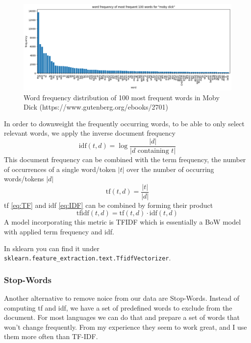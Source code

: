 \begin{figure}[h]
  \centering
  \includegraphics[width=.95\textwidth]{images/word-distribution.png}
  \caption{Word frequency distribution of 100 most frequent words in Moby Dick (https://www.gutenberg.org/ebooks/2701)}
  \label{fig:word-freq-dist}
\end{figure}
In order to downweight the frequently occurring words, to be able to only select relevant words, we apply the inverse
document frequency
\begin{equation}
  \text{idf}(t, d) = \log \frac{|d|}{|d \text{ containing } t|}
  \label{eq:IDF}
\end{equation}
This document frequency can be combined with the term frequency, the number of occurrences of a single word/token $|t|$ over the number of occurring words/tokens $|d|$
\begin{equation}
  \text{tf}(t, d) = \frac{|t|}{|d|}
  \label{eq:TF}
\end{equation}
tf \eqref{eq:TF} and idf \eqref{eq:IDF} can be combined by forming their product
\begin{equation}
  \text{tfidf}(t, d) = \text{tf}(t, d) \cdot \text{idf}(t, d)
  \label{eq:TF-IDF}
\end{equation}
A model incorporating this metric is TFIDF which is essentially a BoW model with applied term frequency and idf.

In sklearn you can find it under \lstinline{sklearn.feature_extraction.text.TfidfVectorizer}.

\subsubsection{Stop-Words}
Another alternative to remove noice from our data are Stop-Words.
Instead of computing tf and idf, we have a set of predefined words to exclude from the document.
For most languages we can do that and prepare a set of words that won't change frequently.
From my experience they seem to work great, and I use them more often than TF-IDF.

